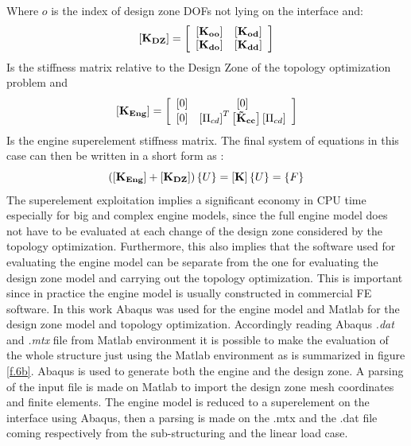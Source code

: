 Where $o$ is the index of design zone DOFs not lying on the interface and:
\begin{equation}
\left[{\mathbf{K_{DZ}}}\right]=\left[ \begin{array}{cc}
    \left[ \mathbf{K_{oo}} \right] & \left[ \mathbf{K_{od}} \right]\\
    \left[ \mathbf{K_{do}} \right] & \left[ \mathbf{K_{dd}} \right] 
    \end{array} \right] 
\end{equation}
Is the stiffness matrix relative to the Design Zone of the topology optimization problem and
\begin{equation}
\left[{\mathbf{K_{Eng}}}\right]=\left[ \begin{array}{cc}
    \left[ 0 \right] & \left[ 0 \right]\\
    \left[ 0 \right] & \left[ \Pi_{cd} \right]^T\left[ \mathbf{\tilde{K}_{cc}} \right]\left[ \Pi_{cd} \right] 
    \end{array} \right] 
\end{equation} 
Is the engine superelement stiffness matrix.
The final system of equations in this case can then be written in a short form as :
\begin{equation}
\left(\left[{\mathbf{K_{Eng}}}\right]+\left[{\mathbf{K_{DZ}}}\right]\right)\left\lbrace{U}\right \rbrace=\left[{\mathbf{K}}\right]\left\lbrace{U}\right \rbrace=\left\lbrace{F}\right \rbrace
\end{equation}
The superelement exploitation implies a significant economy in CPU time especially for big and complex engine models, since the full engine model does not have to be evaluated at each change of the design zone considered by the topology optimization. Furthermore, this also implies that the software used for evaluating the engine model can be separate from the one for evaluating the design zone model and carrying out the topology optimization. This is important since in practice the engine model is usually constructed in commercial FE software. In this work Abaqus was used for the engine model and Matlab for the design zone model and topology optimization. Accordingly reading Abaqus \textit{.dat} and \textit{.mtx} file from Matlab environment it is possible to make the evaluation of the whole structure just using the Matlab environment as is summarized in figure \ref{f.6b}. Abaqus is used to generate both the engine and the design zone. A parsing of the input file is made on Matlab to import the design zone mesh coordinates and finite elements. The engine model is reduced to a superelement on the interface using Abaqus, then a parsing is made on the .mtx and the .dat file coming respectively from the sub-structuring and the linear load case. 
